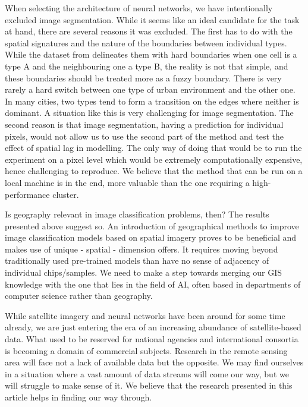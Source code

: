 When selecting the architecture of neural networks, we have intentionally excluded image
segmentation. While it seems like an ideal candidate for the task at hand, there are
several reasons it was excluded. The first has to do with the spatial signatures and the
nature of the boundaries between individual types. While the dataset from
\cite{fleischmann2022geographical} delineates them with hard boundaries when one cell
is a type A and the neighbouring one a type B, the reality is not that simple, and these
boundaries should be treated more as a fuzzy boundary. There is very rarely a hard
switch between one type of urban environment and the other one. In many cities, two
types tend to form a transition on the edges where neither is dominant. A situation like
this is very challenging for image segmentation. The second reason is that image
segmentation, having a prediction for individual pixels, would not allow us to use the
second part of the method and test the effect of spatial lag in modelling. The only
way of doing that would be to run the experiment on a pixel level which would be
extremely computationally expensive, hence challenging to reproduce. We believe that the
method that can be run on a local machine is in the end, more valuable than the one
requiring a high-performance cluster.


Is geography relevant in image classification problems, then? The results presented
above suggest so. An introduction of geographical methods to improve image
classification models based on spatial imagery proves to be beneficial and makes use of
unique - spatial - dimension offers. It requires moving beyond traditionally used
pre-trained models than have no sense of adjacency of individual chips/samples. We need
to make a step towards merging our GIS knowledge with the one that lies in the field of
AI, often based in departments of computer science rather than geography.

While satellite imagery and neural networks have been around for some time already, we
are just entering the era of an increasing abundance of satellite-based data. What used
to be reserved for national agencies and international consortia is becoming a domain of
commercial subjects. Research in the remote sensing area will face not a lack of
available data but the opposite. We may find ourselves in a situation where a vast
amount of data streams will come our way, but we will struggle to make sense of it. We
believe that the research presented in this article helps in finding our way through.